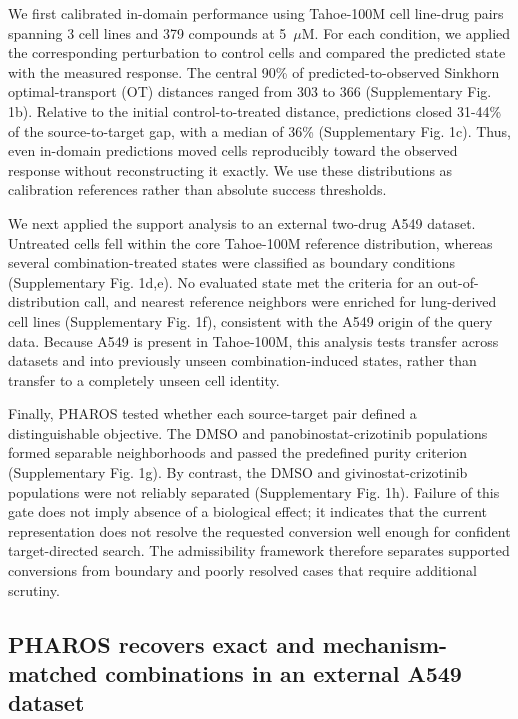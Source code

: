 \documentclass[11pt,a4paper]{article}
\begin{document}
We first calibrated in-domain performance using Tahoe-100M cell line-drug pairs spanning 3 cell lines and 379 compounds at 5~$\mu$M. For each condition, we applied the corresponding perturbation to control cells and compared the predicted state with the measured response. The central 90\% of predicted-to-observed Sinkhorn optimal-transport (OT) distances ranged from 303 to 366 (Supplementary Fig. 1b). Relative to the initial control-to-treated distance, predictions closed 31-44\% of the source-to-target gap, with a median of 36\% (Supplementary Fig. 1c). Thus, even in-domain predictions moved cells reproducibly toward the observed response without reconstructing it exactly. We use these distributions as calibration references rather than absolute success thresholds.

We next applied the support analysis to an external two-drug A549 dataset\cite{Lotfollahi2023}. Untreated cells fell within the core Tahoe-100M reference distribution, whereas several combination-treated states were classified as boundary conditions (Supplementary Fig. 1d,e). No evaluated state met the criteria for an out-of-distribution call, and nearest reference neighbors were enriched for lung-derived cell lines (Supplementary Fig. 1f), consistent with the A549 origin of the query data. Because A549 is present in Tahoe-100M, this analysis tests transfer across datasets and into previously unseen combination-induced states, rather than transfer to a completely unseen cell identity.

Finally, PHAROS tested whether each source-target pair defined a distinguishable objective. The DMSO and panobinostat-crizotinib populations formed separable neighborhoods and passed the predefined purity criterion (Supplementary Fig. 1g). By contrast, the DMSO and givinostat-crizotinib populations were not reliably separated (Supplementary Fig. 1h). Failure of this gate does not imply absence of a biological effect; it indicates that the current representation does not resolve the requested conversion well enough for confident target-directed search. The admissibility framework therefore separates supported conversions from boundary and poorly resolved cases that require additional scrutiny.

\subsection{PHAROS recovers exact and mechanism-matched combinations in an external A549 dataset}\label{subsec3}
\end{document}

